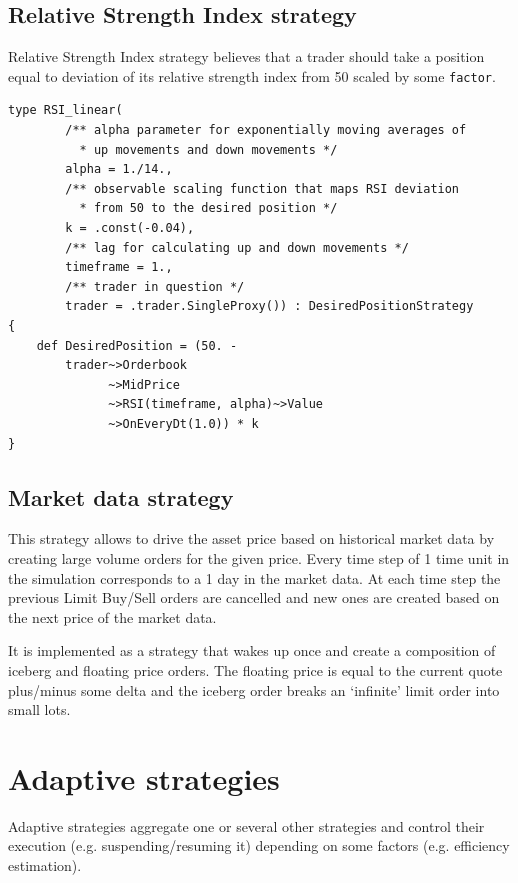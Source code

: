 \documentclass[a4paper,11pt]{article}
\begin{document}
\subsection{Relative Strength Index
strategy}\label{relative-strength-index-strategy}

Relative Strength Index strategy believes that a trader should take a
position equal to deviation of its relative strength index from 50
scaled by some \texttt{factor}.

\begin{verbatim}
type RSI_linear(
        /** alpha parameter for exponentially moving averages of 
          * up movements and down movements */
        alpha = 1./14.,
        /** observable scaling function that maps RSI deviation 
          * from 50 to the desired position */
        k = .const(-0.04),
        /** lag for calculating up and down movements */
        timeframe = 1.,
        /** trader in question */
        trader = .trader.SingleProxy()) : DesiredPositionStrategy
{
    def DesiredPosition = (50. - 
        trader~>Orderbook
              ~>MidPrice
              ~>RSI(timeframe, alpha)~>Value
              ~>OnEveryDt(1.0)) * k
}
\end{verbatim}

\subsection{Market data strategy}\label{market-data-strategy}

This strategy allows to drive the asset price based on historical market
data by creating large volume orders for the given price. Every time
step of 1 time unit in the simulation corresponds to a 1 day in the
market data. At each time step the previous Limit Buy/Sell orders are
cancelled and new ones are created based on the next price of the market
data.

It is implemented as a strategy that wakes up once and create a
composition of iceberg and floating price orders. The floating price is
equal to the current quote plus/minus some delta and the iceberg order
breaks an `infinite' limit order into small lots.

\section{Adaptive strategies}\label{adaptive-strategies}

Adaptive strategies aggregate one or several other strategies and
control their execution (e.g. suspending/resuming it) depending on some
factors (e.g. efficiency estimation).
\end{document}
